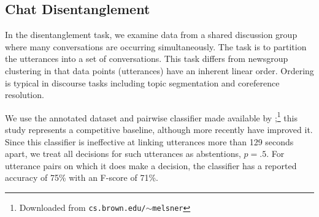 \documentclass[11pt]{article}
\begin{document}


\subsection{Chat Disentanglement}
\label{chat}

In the disentanglement task, we examine data from a shared discussion
group where many conversations are occurring simultaneously. The task
is to partition the utterances into a set of conversations. This task
differs from newsgroup clustering in that data points (utterances)
have an inherent linear order. Ordering is typical in discourse tasks
including topic segmentation and coreference resolution.

We use the annotated dataset and pairwise classifier made available by
;\footnote{Downloaded from
  \texttt{cs.brown.edu/$\sim$melsner}} this study represents a
competitive baseline, although more recently  have
improved it. Since this classifier is ineffective at linking
utterances more than 129 seconds apart, we treat all decisions for
such utterances as abstentions, $p=.5$. For utterance pairs on which
it does make a decision, the classifier has a reported accuracy of
75\% with an F-score of 71\%.
\end{document}
